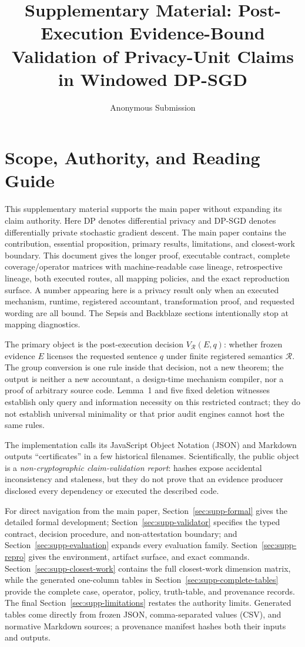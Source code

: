 \documentclass[letterpaper]{article} %
\title{Supplementary Material: Post-Execution Evidence-Bound Validation of Privacy-Unit Claims in Windowed DP-SGD}
\author{Anonymous Submission}
\begin{document}
\maketitle

\section{Scope, Authority, and Reading Guide}
\label{sec:supp-scope}

This supplementary material supports the main paper without expanding its claim authority.
Here DP denotes differential privacy and DP-SGD denotes differentially private
stochastic gradient descent.
The main paper contains the contribution, essential proposition, primary
results, limitations, and closest-work boundary.  This document gives
the longer proof, executable contract, complete coverage/operator matrices
with machine-readable case lineage, retrospective lineage, both executed
routes, all mapping policies, and the exact reproduction surface.  A number appearing here is a
privacy result only when an executed mechanism, runtime, registered
accountant, transformation proof, and requested wording are all bound.  The
Sepsis and Backblaze sections intentionally stop at mapping diagnostics.

The primary object is the post-execution decision
$V_{\mathcal R}(E,q)$: whether frozen evidence $E$ licenses the requested
sentence $q$ under finite registered semantics $\mathcal R$.  The group
conversion is one rule inside that decision, not a new theorem; the output is
neither a new accountant, a design-time mechanism compiler, nor a proof of
arbitrary source code.  Lemma~1 and five fixed deletion witnesses establish
only query and information necessity on this restricted contract; they do not
establish universal minimality or that prior audit engines cannot host the
same rules.

The implementation calls its JavaScript Object Notation (JSON) and Markdown
outputs ``certificates'' in a
few historical filenames.  Scientifically, the public object is a
\emph{non-cryptographic claim-validation report}: hashes expose accidental
inconsistency and staleness, but they do not prove that an evidence producer
disclosed every dependency or executed the described code.

For direct navigation from the main paper,
Section~\ref{sec:supp-formal} gives the detailed formal development;
Section~\ref{sec:supp-validator} specifies the typed contract, decision
procedure, and non-attestation boundary; and
Section~\ref{sec:supp-evaluation} expands every evaluation family.
Section~\ref{sec:supp-repro} gives the environment, artifact surface, and exact
commands.  Section~\ref{sec:supp-closest-work} contains the full closest-work
dimension matrix, while the generated one-column tables in
Section~\ref{sec:supp-complete-tables} provide the complete case, operator,
policy, truth-table, and provenance records.  The final
Section~\ref{sec:supp-limitations} restates the authority limits.  Generated
tables come directly from frozen JSON, comma-separated values (CSV), and
normative Markdown sources; a
provenance manifest hashes both their inputs and outputs.
\end{document}
